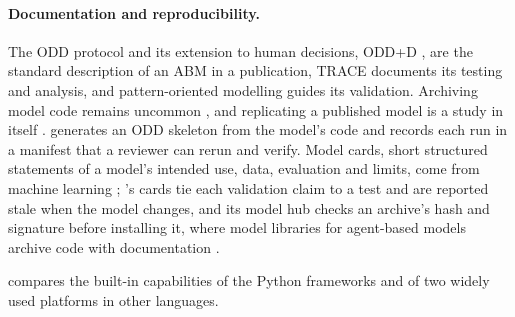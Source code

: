\paragraph{Documentation and reproducibility.} The ODD protocol \citep{grimm2006odd,
grimm2010odd, grimm2020odd} and its extension to human decisions, ODD+D
\citep{muller2013describing}, are the standard description of an ABM in a publication, TRACE
\citep{grimm2014towards} documents its testing and analysis, and pattern-oriented modelling
\citep{grimm2005pattern} guides its validation. Archiving model code remains uncommon
\citep{janssen2017practice}, and replicating a published model is a study in itself
\citep{axtell1996aligning, wilensky2007making}. \modelly{} generates an ODD skeleton from the
model's code and records each run in a manifest that a reviewer can rerun and verify. Model
cards, short structured statements of a model's intended use, data, evaluation and limits,
come from machine learning \citep{mitchell2019model}; \modelly{}'s cards tie each validation
claim to a test and are reported stale when the model changes, and its model hub checks an
archive's hash and signature before installing it, where model libraries for agent-based
models archive code with documentation \citep{janssen2017practice}.

 compares the built-in capabilities of the Python frameworks and of two
widely used platforms in other languages.

